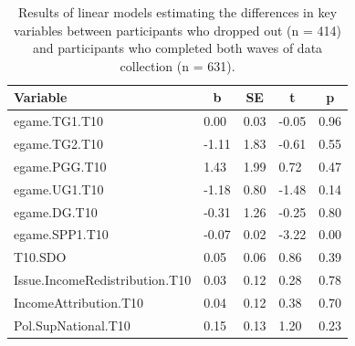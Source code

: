 \documentclass[
  man,floatsintext]{apa6}
\begin{document}
\begin{table}[H]

\begin{center}
\begin{threeparttable}

\caption{\label{tab:biasTable}Results of linear models estimating the differences in
key variables between participants who dropped out (n = 414) and participants
who completed both waves of data collection (n = 631).}

\begin{tabular}{lllll}
\toprule
Variable & \multicolumn{1}{c}{b} & \multicolumn{1}{c}{SE} & \multicolumn{1}{c}{t} & \multicolumn{1}{c}{p}\\
\midrule
egame.TG1.T10 & 0.00 & 0.03 & -0.05 & 0.96\\
egame.TG2.T10 & -1.11 & 1.83 & -0.61 & 0.55\\
egame.PGG.T10 & 1.43 & 1.99 & 0.72 & 0.47\\
egame.UG1.T10 & -1.18 & 0.80 & -1.48 & 0.14\\
egame.DG.T10 & -0.31 & 1.26 & -0.25 & 0.80\\
egame.SPP1.T10 & -0.07 & 0.02 & -3.22 & 0.00\\
T10.SDO & 0.05 & 0.06 & 0.86 & 0.39\\
Issue.IncomeRedistribution.T10 & 0.03 & 0.12 & 0.28 & 0.78\\
IncomeAttribution.T10 & 0.04 & 0.12 & 0.38 & 0.70\\
Pol.SupNational.T10 & 0.15 & 0.13 & 1.20 & 0.23\\
\bottomrule
\end{tabular}

\end{threeparttable}
\end{center}

\end{table}

\newpage
\end{document}
